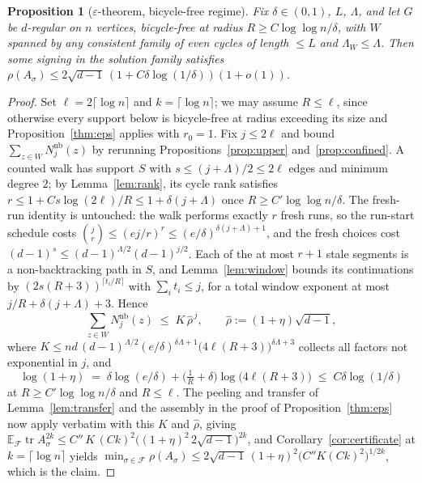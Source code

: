 \documentclass[11pt]{article}
\newtheorem{proposition}[lemma]{Proposition}
\theoremstyle{remark}
\DeclareMathOperator{\tr}{tr}
\begin{document}
\begin{proposition}[$\varepsilon$-theorem, bicycle-free regime]\label{thm:bf}
Fix $\delta\in(0,1)$, $L$, $\Lambda$, and let $G$ be $d$-regular on
$n$ vertices, bicycle-free at radius
$R\ge C\log\log n/\delta$, with $W$ spanned by any consistent family
of even cycles of length $\le L$ and $\Lambda_W\le\Lambda$. Then some
signing in the solution family satisfies
$\rho(A_\sigma)\le2\sqrt{d-1}\,(1+C\delta\log(1/\delta))(1+o(1))$.
\end{proposition}

\begin{proof}
Set $\ell=2\lceil\log n\rceil$ and $k=\lceil\log n\rceil$; we may
assume $R\le\ell$, since otherwise every support below is bicycle-free
at radius exceeding its size and Proposition~\ref{thm:eps} applies
with $r_0=1$. Fix $j\le2\ell$ and bound
$\sum_{z\in W}N^{\mathrm{nb}}_j(z)$ by rerunning
Propositions~\ref{prop:upper} and~\ref{prop:confined}. A counted walk
has support $S$ with $s\le(j+\Lambda)/2\le2\ell$ edges and minimum
degree $2$; by Lemma~\ref{lem:rank}, its cycle rank satisfies
$r\le1+Cs\log(2\ell)/R\le1+\delta(j+\Lambda)$ once
$R\ge C'\log\log n/\delta$. The fresh-run identity is untouched: the
walk performs exactly $r$ fresh runs, so the run-start schedule costs
$\binom{j}{r}\le(ej/r)^{r}\le(e/\delta)^{\delta(j+\Lambda)+1}$, and
the fresh choices cost $(d-1)^{s}\le(d-1)^{\Lambda/2}(d-1)^{j/2}$.
Each of the at most $r+1$ stale segments is a non-backtracking path in
$S$, and Lemma~\ref{lem:window} bounds its continuations by
$(2s(R+3))^{\lceil t_i/R\rceil}$ with $\sum_it_i\le j$, for a total
window exponent at most $j/R+\delta(j+\Lambda)+3$. Hence
\[
\sum_{z\in W}N^{\mathrm{nb}}_j(z)\;\le\;
K\,\hat\rho^{\,j},\qquad
\hat\rho:=(1+\eta)\sqrt{d-1},
\]
where $K\le nd\,(d-1)^{\Lambda/2}(e/\delta)^{\delta\Lambda+1}
\big(4\ell(R+3)\big)^{\delta\Lambda+3}$ collects all factors not
exponential in $j$, and
\[
\log(1+\eta)\;=\;\delta\log(e/\delta)
+\Big(\tfrac1R+\delta\Big)\log\!\big(4\ell(R+3)\big)
\;\le\;C\delta\log(1/\delta)
\]
at $R\ge C'\log\log n/\delta$ and $R\le\ell$. The peeling and transfer
of Lemma~\ref{lem:transfer} and the assembly in the proof of
Proposition~\ref{thm:eps} now apply verbatim with this $K$ and
$\hat\rho$, giving
$\mathbb E_{\mathcal F}\tr A_\sigma^{2k}\le
C''\,K\,(Ck)^{2}\big((1+\eta)^{2}\,2\sqrt{d-1}\big)^{2k}$, and
Corollary~\ref{cor:certificate} at $k=\lceil\log n\rceil$ yields
$\min_{\sigma\in\mathcal F}\rho(A_\sigma)\le
2\sqrt{d-1}\,(1+\eta)^{2}\big(C''K(Ck)^{2}\big)^{1/2k}$, which is the
claim.
\end{proof}
\end{document}
